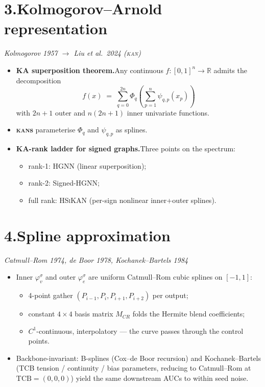 \documentclass[11pt,a4paper]{article}
\newcommand{\KAN}{\textsc{kan}}
\newcommand{\HSiKAN}{\textsc{HSiKAN}}
\begin{document}
\section*{3.\;Kolmogorov--Arnold representation}
\textit{Kolmogorov 1957 \(\to\) Liu et al.\ 2024 (\KAN)}

\begin{itemize}
\item \textbf{KA superposition theorem.}\;Any continuous
  $f : [0, 1]^n \to \mathbb{R}$ admits the decomposition
  \[
    f(x) \;=\; \sum_{q=0}^{2n} \Phi_q\!\left(
      \sum_{p=1}^{n} \psi_{q,p}(x_p)
    \right)
  \]
  with $2n{+}1$ outer and $n(2n{+}1)$ inner univariate functions.
\item \textbf{\KAN s} parameterise $\Phi_q$ and $\psi_{q,p}$ as
  splines.
\item \textbf{KA-rank ladder for signed graphs.}\;Three points on
  the spectrum:
  \begin{itemize}
  \item rank-1: HGNN (linear superposition);
  \item rank-2: Signed-HGNN;
  \item full rank: \HSiKAN{} (per-sign nonlinear inner+outer
    splines).
  \end{itemize}
\end{itemize}

\section*{4.\;Spline approximation}
\textit{Catmull--Rom 1974, de Boor 1978, Kochanek--Bartels 1984}

\begin{itemize}
\item Inner $\varphi_v^\sigma$ and outer $\varphi_e^\sigma$ are
  uniform Catmull--Rom cubic splines on $[-1, 1]$:
  \begin{itemize}
  \item 4-point gather $(P_{i-1}, P_i, P_{i+1}, P_{i+2})$ per
    output;
  \item constant $4 \times 4$ basis matrix $M_{CR}$ folds the
    Hermite blend coefficients;
  \item $C^1$-continuous, interpolatory --- the curve passes
    through the control points.
  \end{itemize}
\item Backbone-invariant: B-splines (Cox--de Boor recursion) and
  Kochanek--Bartels (TCB tension / continuity / bias parameters,
  reducing to Catmull--Rom at $\mathrm{TCB} = (0, 0, 0)$) yield
  the same downstream AUCs to within seed noise.
\end{itemize}
\end{document}
